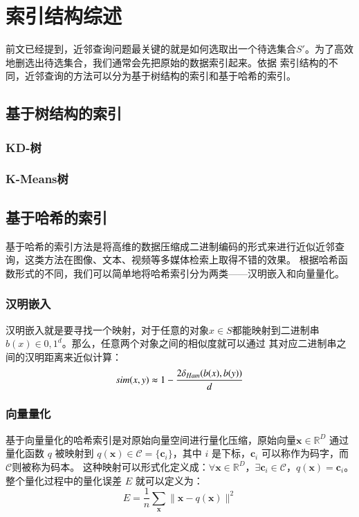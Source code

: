 

\chapter{索引结构综述}
\label{cha:related-work}
前文已经提到，近邻查询问题最关键的就是如何选取出一个待选集合$S'$。为了高效地删选出待选集合，我们通常会先把原始的数据索引起来。依据
索引结构的不同，近邻查询的方法可以分为基于树结构的索引和基于哈希的索引。
\section{基于树结构的索引}
\subsection{KD-树}
\subsection{K-Means树}
\section{基于哈希的索引}
基于哈希的索引方法是将高维的数据压缩成二进制编码的形式来进行近似近邻查询，这类方法在图像、文本、视频等多媒体检索上取得不错的效果。
根据哈希函数形式的不同，我们可以简单地将哈希索引分为两类——汉明嵌入和向量量化。
\subsection{汉明嵌入}
汉明嵌入就是要寻找一个映射，对于任意的对象$x \in S$都能映射到二进制串$b(x) \in {0,1}^d$。那么，任意两个对象之间的相似度就可以通过
其对应二进制串之间的汉明距离来近似计算：
\begin{equation}
sim(x, y)\thickapprox 1 - \frac{2\delta_{Ham}(b(x),b(y))}{d}
\end{equation}
\subsection{向量量化}
基于向量量化的哈希索引是对原始向量空间进行量化压缩，原始向量$\mathbf{x} \in \mathbb{R}^D$ 通过量化函数 $q$ 被映射到 $q(\mathbf{x}) \in \mathcal{C} = \{\mathbf{c}_i\}$，其中 $i$ 是下标，$\mathbf{c}_i$ 可以称作为码字，而$\mathcal{C}$则被称为码本。 这种映射可以形式化定义成：$\forall \mathbf{x} \in \mathbb{R}^D$，$\exists \mathbf{c}_i \in \mathcal{C} $，$q(\mathbf{x})=\mathbf{c}_i$。整个量化过程中的量化误差 $E$ 就可以定义为：
\begin{equation}
E = \frac{1}{n}\sum_{\mathbf{x}}\lVert \mathbf{x} - q(\mathbf{x}) \rVert ^2
\end{equation}

